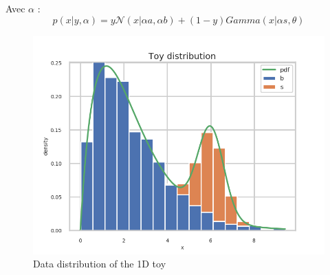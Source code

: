 Avec $\alpha$ :
$$
    p(x | y, \alpha) = y \mathcal N(x|\alpha a, \alpha b) + (1-y) Gamma(x|\alpha s, \theta)
$$

\begin{figure}[htb]
    \includegraphics[width=\linewidth]{Chapter4/Figs/Raster/minitoy/distrib.png}
    \caption{Data distribution of the 1D toy}
    \label{fig:minitoy_distrib}
\end{figure}



